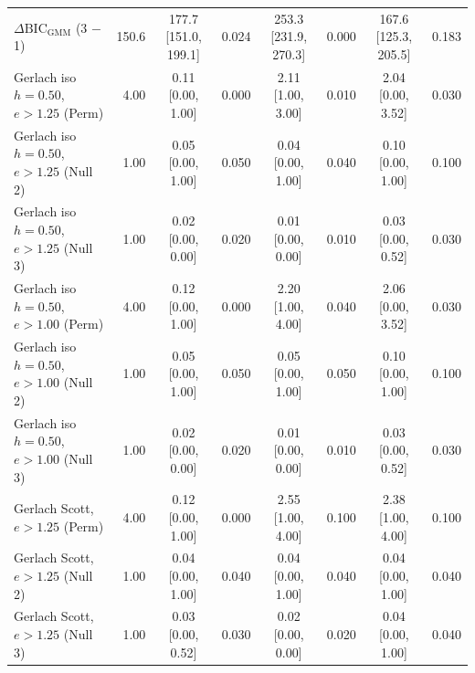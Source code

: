 \begin{table}[htbp]
{\begin{tabular}{lrcccccc}
$\Delta\mathrm{BIC}_{\mathrm{GMM}}$ (3 $-$ 1) & 150.6 & 177.7 [151.0, 199.1] & 0.024 & 253.3 [231.9, 270.3] & 0.000 & 167.6 [125.3, 205.5] & 0.183 \\
Gerlach iso $h{=}0.50$, $e{>}1.25$ (Perm) & 4.00 & 0.11 [0.00, 1.00] & 0.000 & 2.11 [1.00, 3.00] & 0.010 & 2.04 [0.00, 3.52] & 0.030 \\
Gerlach iso $h{=}0.50$, $e{>}1.25$ (Null 2) & 1.00 & 0.05 [0.00, 1.00] & 0.050 & 0.04 [0.00, 1.00] & 0.040 & 0.10 [0.00, 1.00] & 0.100 \\
Gerlach iso $h{=}0.50$, $e{>}1.25$ (Null 3) & 1.00 & 0.02 [0.00, 0.00] & 0.020 & 0.01 [0.00, 0.00] & 0.010 & 0.03 [0.00, 0.52] & 0.030 \\
Gerlach iso $h{=}0.50$, $e{>}1.00$ (Perm) & 4.00 & 0.12 [0.00, 1.00] & 0.000 & 2.20 [1.00, 4.00] & 0.040 & 2.06 [0.00, 3.52] & 0.030 \\
Gerlach iso $h{=}0.50$, $e{>}1.00$ (Null 2) & 1.00 & 0.05 [0.00, 1.00] & 0.050 & 0.05 [0.00, 1.00] & 0.050 & 0.10 [0.00, 1.00] & 0.100 \\
Gerlach iso $h{=}0.50$, $e{>}1.00$ (Null 3) & 1.00 & 0.02 [0.00, 0.00] & 0.020 & 0.01 [0.00, 0.00] & 0.010 & 0.03 [0.00, 0.52] & 0.030 \\
Gerlach Scott, $e{>}1.25$ (Perm) & 4.00 & 0.12 [0.00, 1.00] & 0.000 & 2.55 [1.00, 4.00] & 0.100 & 2.38 [1.00, 4.00] & 0.100 \\
Gerlach Scott, $e{>}1.25$ (Null 2) & 1.00 & 0.04 [0.00, 1.00] & 0.040 & 0.04 [0.00, 1.00] & 0.040 & 0.04 [0.00, 1.00] & 0.040 \\
Gerlach Scott, $e{>}1.25$ (Null 3) & 1.00 & 0.03 [0.00, 0.52] & 0.030 & 0.02 [0.00, 0.00] & 0.020 & 0.04 [0.00, 1.00] & 0.040 \\
\bottomrule
\end{tabular}%
}
\end{table}
